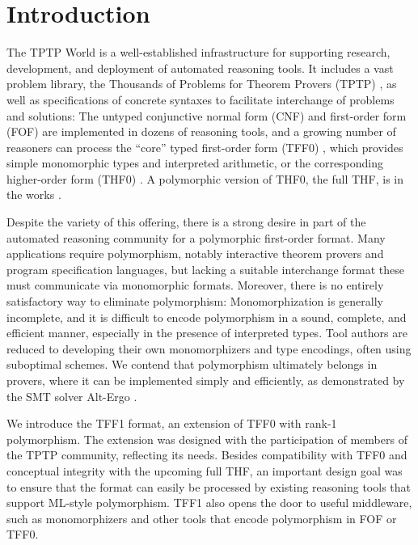 \section{Introduction}
\label{sec_intro}

The TPTP World \cite{sutcliffe-2010-world} is a well-established infrastructure
for supporting research, development, and deployment of automated reasoning
tools. It includes a vast problem library, the Thousands of Problems for Theorem
Provers (TPTP) \cite{sutcliffe-2009-lib}, as well as specifications of concrete
syntaxes to facilitate interchange of problems and solutions: The untyped
conjunctive normal form (CNF) and first-order form (FOF) are implemented in
dozens of reasoning tools, and a growing number of reasoners can process the
``core'' typed first-order form (TFF0) \cite{sutcliffe-et-al-2012-tff0},
which provides simple monomorphic types and interpreted arithmetic,
or the corresponding higher-order form (THF0) \cite{benzmueller-et-al-2008-thf0}.
A polymorphic version of THF0, the full THF, is in the works
\cite{sutcliffe-benzmueller-2010}.

Despite the variety of this offering, there is a strong desire in part of the automated
reasoning community for a polymorphic first-order format. Many applications
require polymorphism, notably interactive theorem provers and program
specification languages, but lacking a suitable interchange format these
must communicate via monomorphic formats. Moreover, there is no entirely
satisfactory way to eliminate polymorphism: Monomorphization is generally
incomplete, and it is difficult to encode polymorphism in a sound, complete, and
efficient manner, especially in the presence of interpreted types. Tool authors
are reduced to developing their own monomorphizers and type encodings, often
using suboptimal schemes. We contend that polymorphism ultimately belongs in
provers, where it can be implemented simply and efficiently, as demonstrated by
the SMT solver Alt-Ergo \cite{bobot-et-al-2008}.

We introduce the TFF1
format, an extension of TFF0 with rank-1 polymorphism. The
extension was designed with the participation of members of the TPTP community,
reflecting its needs.
Besides compatibility with TFF0 and conceptual integrity with the upcoming full
THF, an important design goal was to ensure that the format can easily be
processed by existing reasoning tools that support ML-style polymorphism. TFF1
also opens the door to useful middleware, such as monomorphizers and other
tools that encode polymorphism in FOF or TFF0.

